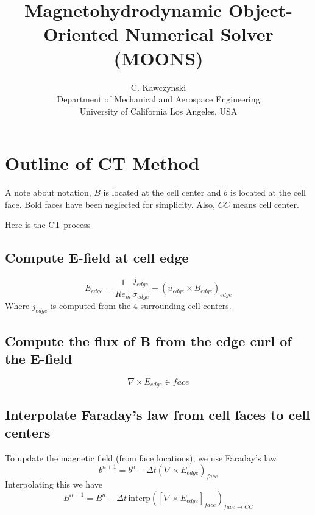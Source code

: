 \documentclass[11pt]{article}
\begin{document}
\doublespacing
\title{Magnetohydrodynamic Object-Oriented Numerical Solver (MOONS)}
\author{C. Kawczynski \\
Department of Mechanical and Aerospace Engineering \\
University of California Los Angeles, USA\\
}
\maketitle

\section{Outline of CT Method}
A note about notation, $B$ is located at the cell center and $b$ is located at the cell face. Bold faces have been neglected for simplicity. Also, $CC$ means cell center.

Here is the CT process
\subsection{Compute E-field at cell edge}
\begin{equation}
	E_{edge} = \frac{1}{Re_m} \frac{j_{edge}}{\sigma_{edge}} - 
	(u_{edge} \times B_{edge})_{edge}
\end{equation}
Where $j_{edge}$ is computed from the 4 surrounding cell centers.

\subsection{Compute the flux of B from the edge curl of the E-field}

\begin{equation}
	\nabla \times E_{edge} \in face
\end{equation}

\subsection{Interpolate Faraday's law from cell faces to cell centers}
To update the magnetic field (from face locations), we use Faraday's law
\begin{equation}
	b^{n+1} = b^{n} - \Delta t
	\left(
	\nabla \times E_{edge}
	\right)_{face}
\end{equation}
Interpolating this we have
\begin{equation}
	B^{n+1} = B^{n} - \Delta t \,
	\text{interp}(
	\left[
	\nabla \times E_{edge}
	\right]_{face}
	)_{face \rightarrow CC}
\end{equation}
\end{document}
